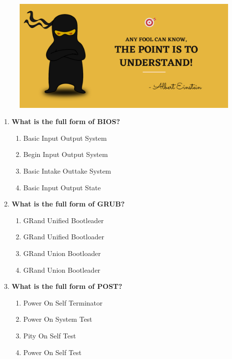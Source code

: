 \setlength{\columnsep}{3pt}
\begin{flushleft}
	
	\paragraph{}
	\bigskip
	
	\begin{figure}[h!]
		\centering
		\includegraphics[scale=.2]{content/practise.jpg}
	\end{figure}	
	\begin{enumerate}
		
		\item \textbf{What is the full form of BIOS?}
		\begin{enumerate}[label=(\alph*)]
			\item Basic Input Output System    %
			\item Begin Input Output System
			\item Basic Intake Outtake System
			\item Basic Input Output State
		\end{enumerate}
		\bigskip
		\bigskip	

		\item \textbf{What is the full form of GRUB?}
		\begin{enumerate}[label=(\alph*)]
			\item GRand Unified Bootleader    
			\item GRand Unified Bootloader   %
			\item GRand Union Bootloader
			\item GRand Union Bootleader
		\end{enumerate}
		\bigskip
		\bigskip	
		
		\item \textbf{What is the full form of POST?		}	
		\begin{enumerate}[label=(\alph*)]
			\item Power On Self Terminator
			\item Power On System Test    
			\item Pity On Self Test    
			\item Power On Self Test    %
		\end{enumerate}
		\bigskip
		\bigskip	
		

\end{enumerate}
\end{flushleft}

